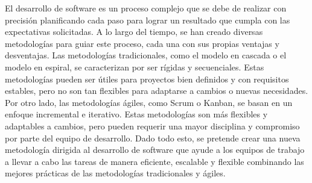 El desarrollo de software es un proceso complejo que se debe de realizar con precisión
planificando cada paso para lograr un resultado que cumpla con las expectativas
solicitadas. A lo largo del tiempo, se han creado diversas metodologías para guiar este
proceso, cada una con sus propias ventajas y desventajas.
Las metodologías tradicionales, como el modelo en cascada o el modelo en espiral, se
caracterizan por ser rígidas y secuenciales. Estas metodologías pueden ser útiles para
proyectos bien definidos y con requisitos estables, pero no son tan flexibles para adaptarse
a cambios o nuevas necesidades.
Por otro lado, las metodologías ágiles, como Scrum o Kanban, se basan en un enfoque
incremental e iterativo. Estas metodologías son más flexibles y adaptables a cambios, pero
pueden requerir una mayor disciplina y compromiso por parte del equipo de desarrollo.
Dado todo esto, se pretende crear una nueva metodología dirigida al desarrollo de software
que ayude a los equipos de trabajo a llevar a cabo las tareas de manera eficiente, escalable
y flexible combinando las mejores prácticas de las metodologías tradicionales y ágiles.
